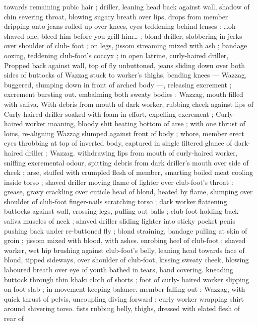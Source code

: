{towards remaining pubic hair ; driller, leaning head back against wall, 
shadow of chin severing throat, blowing sugary breath over lips, 
drops from member dripping onto jeans rolled up over knees, eyes 
teddening behind lenses : {\gl}{\ldots}oh shaved one, bleed him before you 
grill him{\ldots}{\gr} ; blond driller, slobbering in jerks over shoulder of club- 
foot ; on legs, jissom streaming mixed with ash ; bandage oozing, 
teddening club-foot's coccyx ; in open latrine, curly-haired driller, 
Propped back against wall, top of fly unbuttoned, jeans sliding down 
over both sides of buttocks of Wazzag stuck to worker's thighs, 
bending knees --- Wazzag, buggered, slumping down in front of 
arched body ---, releasing excrement ; excrement bursting out. 
embalming both sweaty bodies : Wazzag, mouth filled with saliva, 
With debris from mouth of dark worker, rubbing cheek against lips of 
Curly-haired driller soaked with foam in effort, expelling excrement ; 
Curly-haired worker moaning, bloody shit heating bottom of arse ; 
with one thrust of loins, re-aligning Wazzag slumped against front of 
body ; whore, member erect eyes throbbing at top of inverted body, 
captured in single filtered glance of dark-haired driller ; Wazzag. 
withdrawing lips from mouth of curly-haired worker, sniffing 
excremental odour, spitting debris from dark driller's mouth over side 
of cheek ; arse, stuffed with crumpled flesh of member, smarting 
boiled meat cooling inside torso ; shaved driller moving flame of 
lighter over club-foot's throat : grease, gravy crackling over cuticle 
head of blond, heated by flame, slumping over shoulder of club-foot 
finger-nails scratching torso ; dark worker flattening buttocks against 
wall, crossing legs, pulling out balls ; club-foot holding back saliva 
muscles of neck ; shaved driller sliding lighter into sticky pocket 
penis pushing back under re-buttoned fly ; blond straining, bandage 
pulling at skin of groin ; jissom mixed with blood, with ashes. 
enrobing heel of club-foot ; shaved worker, wet hip brushing against 
club-foot's belly, leaning head towards face of blond, tipped 
sideways, over shoulder of club-foot, kissing sweaty cheek, blowing 
laboured breath over eye of youth bathed in tears, hand covering. 
kneading buttock through thin khaki cloth of shorts ; foot of curly- 
haired worker slipping on foot-slab ; in movement keeping balance. 
member falling out : Wazzag, with quick thrust of pelvis, uncoupling 
diving forward ; curly worker wrapping shirt around shivering torso. 
fists rubbing belly, thighs, dressed with elated flesh of rear of 
}
